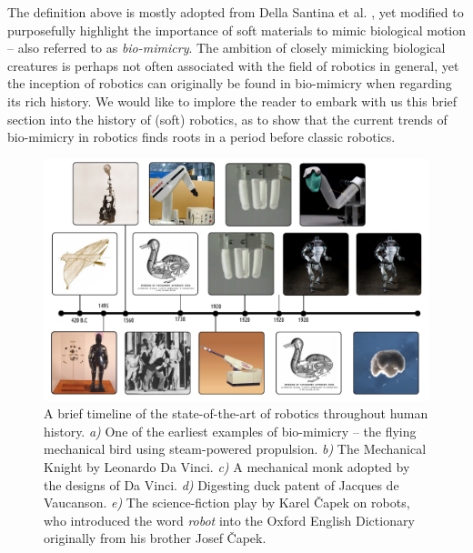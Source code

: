 The definition above is mostly adopted from Della Santina et al. \cite{}, yet modified to purposefully highlight the importance of soft materials to mimic biological motion -- also referred to as \emph{bio-mimicry}. The ambition of closely mimicking biological creatures is perhaps not often associated with the field of robotics in general, yet the inception of robotics can originally be found in bio-mimicry when regarding its rich history. We would like to implore the reader to embark with us this brief section into the history of (soft) robotics, as to show that the current trends of bio-mimicry in robotics finds roots in a period before classic robotics.
%
\begin{figure}
\hspace{-7mm}
\includegraphics[width=1.11\textwidth]{./3_chapters/0_introduction/img/timeline.pdf}
\caption{A brief timeline of the state-of-the-art of robotics throughout human history. \textit{a)} One of the earliest examples of bio-mimicry -- the flying mechanical bird using steam-powered propulsion. \textit{b)} The Mechanical Knight by Leonardo Da Vinci. \textit{c)} A mechanical monk adopted by the designs of Da Vinci. \textit{d)} Digesting duck patent of Jacques de Vaucanson. \textit{e)} The science-fiction play by Karel \v{C}apek on robots, who introduced the word \emph{robot} into the Oxford English Dictionary originally from his brother Josef \v{C}apek.}
\end{figure}
%
